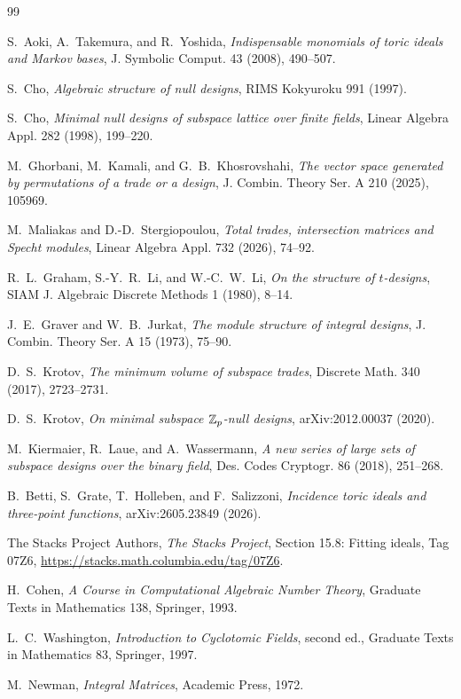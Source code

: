 \documentclass[11pt]{article}
\begin{document}
\begin{thebibliography}{99}

S.~Aoki, A.~Takemura, and R.~Yoshida,
\emph{Indispensable monomials of toric ideals and Markov bases},
J. Symbolic Comput. 43 (2008), 490--507.

S.~Cho,
\emph{Algebraic structure of null designs},
RIMS Kokyuroku 991 (1997).

S.~Cho,
\emph{Minimal null designs of subspace lattice over finite fields},
Linear Algebra Appl. 282 (1998), 199--220.

M.~Ghorbani, M.~Kamali, and G.~B.~Khosrovshahi,
\emph{The vector space generated by permutations of a trade or a design},
J. Combin. Theory Ser. A 210 (2025), 105969.

M.~Maliakas and D.-D.~Stergiopoulou,
\emph{Total trades, intersection matrices and Specht modules},
Linear Algebra Appl. 732 (2026), 74--92.

R.~L.~Graham, S.-Y.~R.~Li, and W.-C.~W.~Li,
\emph{On the structure of \(t\)-designs},
SIAM J. Algebraic Discrete Methods 1 (1980), 8--14.

J.~E.~Graver and W.~B.~Jurkat,
\emph{The module structure of integral designs},
J. Combin. Theory Ser. A 15 (1973), 75--90.

D.~S.~Krotov,
\emph{The minimum volume of subspace trades},
Discrete Math. 340 (2017), 2723--2731.

D.~S.~Krotov,
\emph{On minimal subspace \(\mathbb Z_p\)-null designs},
arXiv:2012.00037 (2020).

M.~Kiermaier, R.~Laue, and A.~Wassermann,
\emph{A new series of large sets of subspace designs over the binary
field},
Des. Codes Cryptogr. 86 (2018), 251--268.

B.~Betti, S.~Grate, T.~Holleben, and F.~Salizzoni,
\emph{Incidence toric ideals and three-point functions},
arXiv:2605.23849 (2026).

The Stacks Project Authors,
\emph{The Stacks Project}, Section 15.8: Fitting ideals, Tag 07Z6,
\url{https://stacks.math.columbia.edu/tag/07Z6}.

H.~Cohen,
\emph{A Course in Computational Algebraic Number Theory},
Graduate Texts in Mathematics 138, Springer, 1993.

L.~C.~Washington,
\emph{Introduction to Cyclotomic Fields}, second ed.,
Graduate Texts in Mathematics 83, Springer, 1997.

M.~Newman,
\emph{Integral Matrices}, Academic Press, 1972.
\end{thebibliography}
\end{document}
